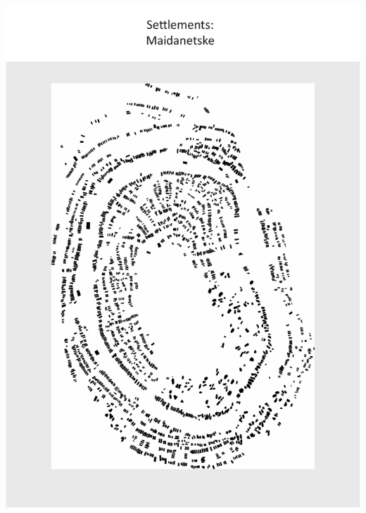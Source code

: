 \documentclass[
  12pt,
  a4paper, twoside]{book}
\begin{document}
\begin{center}\includegraphics[width=1\linewidth]{Appendix/maidanetske} \end{center}

\newpage
\end{document}
